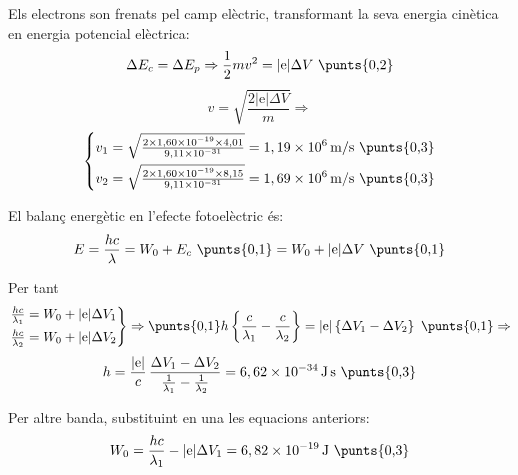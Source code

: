 \begin{solapartat}
Els electrons son frenats pel camp elèctric, transformant la seva energia cinètica en energia potencial elèctrica: 
\[ \Delta E_c = \Delta E_p \Rightarrow \frac{1}{2}mv^2 = |\mathrm{e}|\Delta V\ \text{\punts{0,2}} \]
\[ v = \sqrt{\frac{2|\mathrm{e}|\Delta V}{m}} \Rightarrow \]
\[ \left\{\begin{aligned}
v_1 &= \sqrt{\tfrac{2\times 1,60\times 10^{-19}\times 4,01}{9,11\times 10^{-31}}} = 1,19\times 10^{6}\,\mathrm{m/s}\ \text{\punts{0,3}}\\
v_2 &= \sqrt{\tfrac{2\times 1,60\times 10^{-19}\times 8,15}{9,11\times 10^{-31}}} = 1,69\times 10^{6}\,\mathrm{m/s}\ \text{\punts{0,3}}
\end{aligned}\right. \]
\end{solapartat}

\begin{solapartat}
El balanç energètic en l'efecte fotoelèctric és:
\[ E = \frac{hc}{\lambda} = W_0 + E_c\ \text{\punts{0,1}} = W_0 + |\mathrm{e}|\Delta V\ \text{\punts{0,1}} \]

Per tant
\[ \left.\begin{aligned}
\tfrac{hc}{\lambda_1} &= W_0 + |\mathrm{e}|\Delta V_1\\
\tfrac{hc}{\lambda_2} &= W_0 + |\mathrm{e}|\Delta V_2
\end{aligned}\right\} \Rightarrow \text{\punts{0,1}} h\left\{\frac{c}{\lambda_1} - \frac{c}{\lambda_2}\right\} = |\mathrm{e}|\left\{\Delta V_1 - \Delta V_2\right\}\ \text{\punts{0,1}} \Rightarrow \]
\[ h = \frac{|\mathrm{e}|}{c}\,\frac{\Delta V_1 - \Delta V_2}{\frac{1}{\lambda_1} - \frac{1}{\lambda_2}} = 6,62\times 10^{-34}\,\mathrm{J\,s}\ \text{\punts{0,3}} \]

Per altre banda, substituint en una les equacions anteriors:
\[ W_0 = \frac{hc}{\lambda_1} - |\mathrm{e}|\Delta V_1 = 6,82\times 10^{-19}\,\mathrm{J}\ \text{\punts{0,3}} \]
\end{solapartat}
